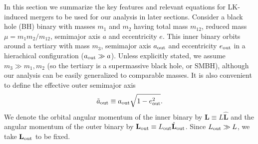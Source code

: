 \documentclass[
        twocolumn,
        twocolappendix
    ]{aastex63}
\renewcommand*{\bm}[1]{\boldsymbol{\mathbf{#1}}}
\newcommand*{\uv}[1]{\hat{\bm{#1}}}
\begin{document}
In this section we summarize the key features and relevant equations for
LK-induced mergers to be used for our analysis in later sections. Consider a
black hole (BH) binary with masses $m_1$ and $m_2$ having total mass $m_{12}$,
reduced mass $\mu = m_1 m_2 / m_{12}$, semimajor axis $a$ and eccentricity $e$.
This inner binary orbits around a tertiary with mass $m_3$, semimajor axis
$a_{\rm out}$ and eccentricity $e_{\rm out}$ in a hierachical configuration
($a_{\rm out}\gg a$). Unless explicitly stated, we assume $m_3 \gg m_1, m_2$ (so
the tertiary is a supermassive black hole, or SMBH), although our analysis can
be easily generalized to comparable masses. It is also convenient to define the
effective outer semimajor axis
\begin{equation}
    \tilde{a}_{\rm out} \equiv a_{\rm out}\sqrt{1 - e_{\rm out}^2}.
\end{equation}
We denote the orbital angular momentum of the inner binary by $\bm{L} \equiv L
\uv{L}$ and the angular momentum of the outer binary by $\bm{L}_{\rm out} \equiv
L_{\rm out} \uv{L}_{\rm out}$. Since $L_{\rm out} \gg L$, we take $\bm{L}_{\rm
out}$ to be fixed.
\end{document}
